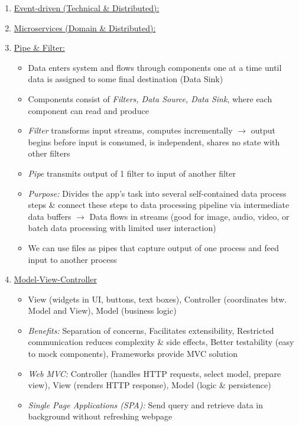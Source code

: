 \documentclass[landscape]{article}
\begin{document}
\begin{multicols*}{5}
\begin{itemize}
\begin{enumerate}
        \item \underline{Event-driven (Technical \& Distributed):}
        \item \underline{Microservices (Domain \& Distributed):}
        \item \underline{Pipe \& Filter:}
        \begin{itemize}
          \item Data enters system and flows through components one at a time until data is assigned to some final destination (Data Sink)
          \item Components consist of \textit{Filters, Data Source, Data Sink}, where each component can read and produce
          \item \textit{Filter} transforms input streams, computes incrementally $\rightarrow$ output begins before input is consumed, is independent, shares no state with other filters
          \item \textit{Pipe} transmits output of 1 filter to input of another filter
          \item \textit{Purpose:} Divides the app's task into several self-contained data process steps \& connect these steps to data processing pipeline via intermediate data buffers $\rightarrow$ Data flows in streams (good for image, audio, video, or batch data processing with limited user interaction)
          \item We can use files as pipes that capture output of one process and feed input to another process
        \end{itemize}
        \item \underline{Model-View-Controller}
        \begin{itemize}
          \item View (widgets in UI, buttons, text boxes), Controller (coordinates btw. Model and View), Model (business logic)
          \item \textit{Benefits:} Separation of concerns, Facilitates extensibility, Restricted communication reduces complexity \& side effects, Better testability (easy to mock components), Frameworks provide MVC solution
          \item \textit{Web MVC:} Controller (handles HTTP requests, select model, prepare view), View (renders HTTP response), Model (logic \& persistence)
          \item \textit{Single Page Applications (SPA):} Send query and retrieve data in background without refreshing webpage
        \end{itemize}
      \end{enumerate}
    \end{itemize}


\end{multicols*}
\end{document}
